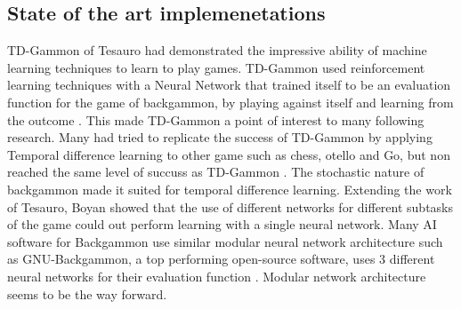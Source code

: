 \documentclass[12pt,a4paper]{article}
\begin{document}
\subsection{State of the art implemenetations}
TD-Gammon of Tesauro \citeyear{DBLP:conf/icml/Tesauro92,DBLP:journals/ai/Tesauro02} had demonstrated the impressive ability of machine learning techniques to learn to play games.  TD-Gammon used reinforcement learning techniques with a Neural Network that trained itself to be an evaluation function for the game of backgammon, by playing against itself and learning from the outcome \cite{DBLP:journals/ai/Tesauro02}. This made TD-Gammon a point of interest to many following research. Many had tried to replicate the success of TD-Gammon by applying Temporal difference learning to other game such as chess, otello and Go, but non reached the same level of succuss as TD-Gammon \cite{survey}. The stochastic nature of backgammon made it suited for temporal difference learning. Extending the work of Tesauro, Boyan \citeyear{boyan} showed that the use of different networks for different subtasks of the game could out perform learning with a single neural network. Many AI software for Backgammon use similar modular neural network architecture such as GNU-Backgammon, a top performing open-source software, uses 3 different neural networks for their evaluation function \cite{gnubg}. Modular network architecture seems to be the way forward.
\end{document}
